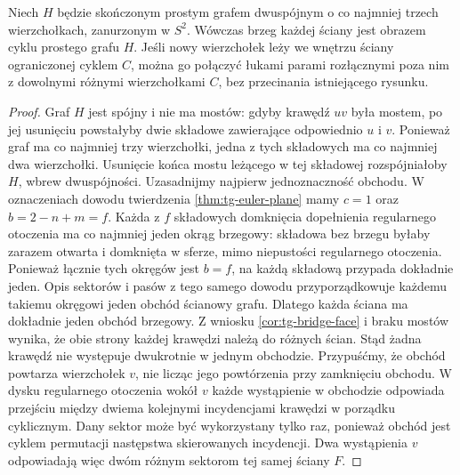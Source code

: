 \begin{lemat}
\label{lem:tg-kuratowski-face-cycle}
Niech $H$ będzie skończonym prostym
grafem dwuspójnym o co
najmniej trzech wierzchołkach,
zanurzonym w $S^2$.
Wówczas brzeg każdej
ściany jest obrazem
cyklu prostego grafu $H$.
Jeśli nowy wierzchołek
leży we wnętrzu ściany
ograniczonej cyklem $C$,
można go połączyć
łukami parami rozłącznymi
poza nim z dowolnymi
różnymi wierzchołkami $C$,
bez przecinania
istniejącego rysunku.
\end{lemat}
\begin{proof}
Graf $H$ jest spójny i nie ma mostów: gdyby
krawędź $uv$ była mostem, po jej usunięciu powstałyby
dwie składowe zawierające odpowiednio $u$ i $v$.
Ponieważ graf ma co najmniej trzy wierzchołki,
jedna z tych składowych ma co najmniej dwa wierzchołki.
Usunięcie końca mostu leżącego w tej składowej
rozspójniałoby $H$, wbrew dwuspójności.
Uzasadnijmy najpierw jednoznaczność obchodu.
W oznaczeniach dowodu twierdzenia
\ref{thm:tg-euler-plane} mamy $c=1$ oraz
$b=2-n+m=f$. Każda z $f$ składowych domknięcia
dopełnienia regularnego otoczenia ma co najmniej
jeden okrąg brzegowy: składowa bez brzegu byłaby
zarazem otwarta i domknięta w sferze, mimo
niepustości regularnego otoczenia. Ponieważ łącznie
tych okręgów jest $b=f$, na każdą składową
przypada dokładnie jeden. Opis sektorów i pasów
z tego samego dowodu przyporządkowuje każdemu
takiemu okręgowi jeden obchód ścianowy grafu.
Dlatego każda ściana ma dokładnie jeden obchód
brzegowy. Z wniosku \ref{cor:tg-bridge-face}
i braku mostów wynika, że obie strony każdej krawędzi
należą do różnych ścian. Stąd żadna krawędź nie
występuje dwukrotnie w jednym obchodzie.
Przypuśćmy, że obchód powtarza wierzchołek $v$,
nie licząc jego powtórzenia przy zamknięciu obchodu. W dysku regularnego
otoczenia wokół $v$ każde wystąpienie w obchodzie
odpowiada przejściu między dwiema kolejnymi
incydencjami krawędzi w porządku cyklicznym.
Dany sektor może być wykorzystany tylko raz,
ponieważ obchód jest cyklem permutacji następstwa
skierowanych incydencji. Dwa wystąpienia $v$
odpowiadają więc dwóm różnym sektorom tej samej
ściany $F$.


\end{proof}
